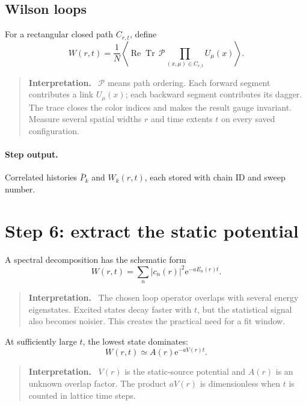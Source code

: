 \documentclass[11pt]{article}
\newcommand{\ReTr}{\operatorname{Re}\operatorname{Tr}}
\newcommand{\ee}{\mathrm{e}}
\newenvironment{interpretation}
  {\begin{quote}\small\noindent\textbf{Interpretation.}\ }
  {\end{quote}}
\begin{document}
\subsection{Wilson loops}

For a rectangular closed path \(C_{r,t}\), define
\begin{equation}
  W(r,t)=\frac{1}{N}
  \left\langle
    \ReTr\,
    \mathcal P\!\!\prod_{(x,\mu)\in C_{r,t}}U_\mu(x)
  \right\rangle.
  \label{eq:wilson-loop}
\end{equation}

\begin{interpretation}
\(\mathcal P\) means path ordering. Each forward segment contributes a link
\(U_\mu(x)\); each backward segment contributes its dagger. The trace closes
the color indices and makes the result gauge invariant. Measure several
spatial widths \(r\) and time extents \(t\) on every saved configuration.
\end{interpretation}

\paragraph{Step output.}
Correlated histories \(\bar P_k\) and \(W_k(r,t)\), each stored with chain ID
and sweep number.

\section{Step 6: extract the static potential}

A spectral decomposition has the schematic form
\begin{equation}
  W(r,t)=\sum_n |c_n(r)|^2\ee^{-aE_n(r)t}.
  \label{eq:spectral}
\end{equation}

\begin{interpretation}
The chosen loop operator overlaps with several energy eigenstates. Excited
states decay faster with \(t\), but the statistical signal also becomes noisier.
This creates the practical need for a fit window.
\end{interpretation}

At sufficiently large \(t\), the lowest state dominates:
\begin{equation}
  W(r,t)\simeq A(r)\ee^{-aV(r)t}.
  \label{eq:large-time}
\end{equation}

\begin{interpretation}
\(V(r)\) is the static-source potential and \(A(r)\) is an unknown overlap
factor. The product \(aV(r)\) is dimensionless when \(t\) is counted in lattice
time steps.
\end{interpretation}
\end{document}
